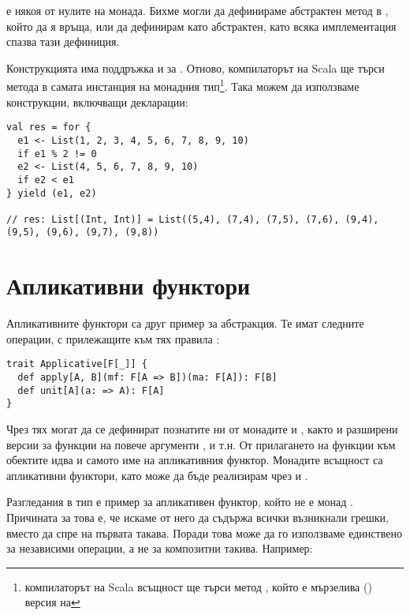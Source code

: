  е някоя от нулите на монада. Бихме могли да дефинираме абстрактен метод  в , който да я връща, или да дефинирам  като абстрактен, като всяка имплементация спазва тази дефиниция.

Конструкцията  има поддръжка и за . Отново, компилаторът на Scala ще търси метода в самата инстанция на монадния тип\footnote{компилаторът на Scala всъщност ще търси метод , който е мързелива () версия на }. Така можем да използваме  конструкции, включващи  декларации:

\begin{lstlisting}
val res = for {
  e1 <- List(1, 2, 3, 4, 5, 6, 7, 8, 9, 10)
  if e1 % 2 != 0
  e2 <- List(4, 5, 6, 7, 8, 9, 10)
  if e2 < e1
} yield (e1, e2)

// res: List[(Int, Int)] = List((5,4), (7,4), (7,5), (7,6), (9,4), (9,5), (9,6), (9,7), (9,8))
\end{lstlisting}

\section{Апликативни функтори}
\label{sec:applicatives}

Апликативните функтори са друг пример за абстракция. Те имат следните операции, с прилежащите към тях правила \cite{chiusano2014FPinScala}:

\begin{lstlisting}
trait Applicative[F[_]] {
  def apply[A, B](mf: F[A => B])(ma: F[A]): F[B]
  def unit[A](a: => A): F[A]
}
\end{lstlisting}

Чрез тях могат да се дефинират познатите ни от монадите  и , както и разширени версии за функции на повече аргументи ,  и т.н. От прилагането на функции към обектите идва и самото име на апликативния функтор. Монадите всъщност са апликативни функтори, като  може да бъде реализирам чрез  и .

Разгледания в  тип  е пример за апликативен функтор, който не е монад \cite{chiusano2014FPinScala}. Причината за това е, че искаме от него да съдържа всички възникнали грешки, вместо да спре на първата такава. Поради това може да го използваме единствено за независими операции, а не за композитни такива. Например:

